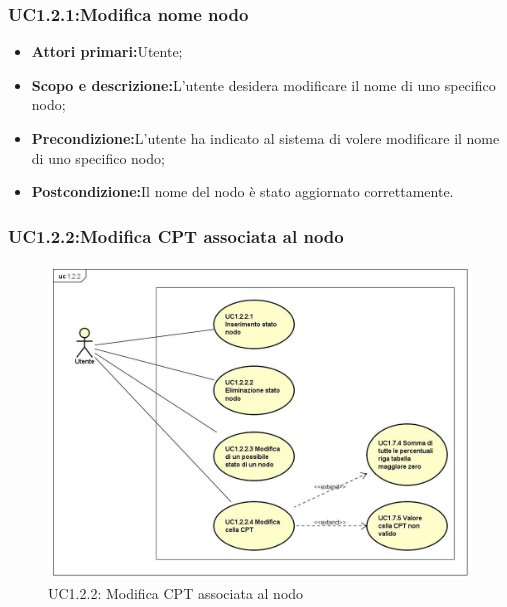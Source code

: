 \subsubsection{UC1.2.1:Modifica nome nodo}
\begin{itemize}
	\item{\textbf{Attori primari:}Utente;}
	\item{\textbf{Scopo e descrizione:}L'utente desidera modificare il nome di uno specifico nodo;}
	\item{\textbf{Precondizione:}L'utente ha indicato al sistema di volere modificare il nome di uno specifico nodo;}
	\item{\textbf{Postcondizione:}Il nome del nodo è stato aggiornato correttamente.}
\end{itemize}
\subsubsection{UC1.2.2:Modifica CPT associata al nodo}
\begin{figure} [H]
	\centering
	\includegraphics[scale=0.45]{Img/UC1-2-2}
	\caption{UC1.2.2: Modifica CPT associata al nodo}\label{}
\end{figure}
